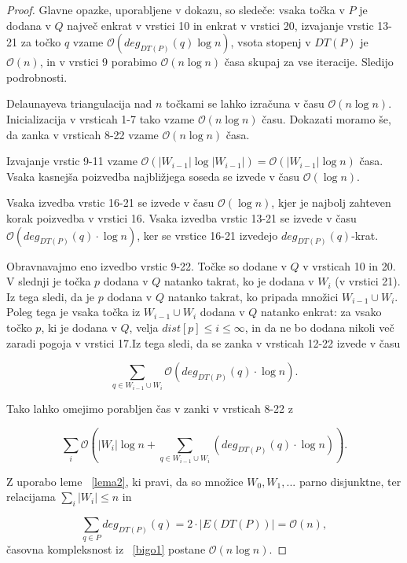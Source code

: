 \documentclass[a4paper, 12pt]{book}
\newcommand{\OO}{\ensuremath{\mathcal{O}}} %
\begin{document}
\begin{proof}
Glavne opazke, uporabljene v dokazu, so sledeče: vsaka točka v $P$ je dodana v $Q$ največ enkrat v vrstici 10 in enkrat v vrstici 20, izvajanje vrstic 13-21 za točko $q$ vzame $\OO(deg_{DT(P)}(q)\log n)$, vsota stopenj v $DT(P)$ je $\OO(n)$, in v vrstici 9 porabimo $\OO(n\log n)$ časa skupaj za vse iteracije. Sledijo podrobnosti.

Delaunayeva triangulacija nad $n$ točkami se lahko izračuna v času $\OO(n\log n)$. Inicializacija v vrsticah 1-7 tako vzame $\OO(n\log n)$ času. Dokazati moramo še, da zanka v vrsticah 8-22 vzame $\OO(n\log n)$ časa.

Izvajanje vrstic 9-11 vzame $\OO(|W_{i-1}|\log |W_{i-1}|) = \OO(|W_{i-1}|\log n)$ časa. Vsaka kasnejša poizvedba najbližjega soseda se izvede v času $\OO(\log n)$.

Vsaka izvedba vrstic 16-21 se izvede v času $\OO(\log n)$, kjer je najbolj zahteven korak poizvedba v vrstici 16. Vsaka izvedba vrstic 13-21 se izvede v času $\OO(deg_{DT(P)}(q)\cdot\log n)$, ker se vrstice 16-21 izvedejo $deg_{DT(P)}(q)$-krat.

Obravnavajmo eno izvedbo vrstic 9-22. Točke so dodane v $Q$ v vrsticah 10 in 20. V slednji je točka $p$ dodana v $Q$ natanko takrat, ko je dodana v $W_i$ (v vrstici 21). Iz tega sledi, da je $p$ dodana v $Q$ natanko takrat, ko pripada množici $W_{i-1}\cup W_i$. Poleg tega je vsaka točka iz $W_{i-1}\cup W_i$ dodana v $Q$ natanko enkrat: za vsako točko $p$, ki je dodana v $Q$, velja $dist[p]\leq i \le \infty$, in da ne bo dodana nikoli več zaradi pogoja v vrstici 17.Iz tega sledi, da se zanka v vrsticah 12-22 izvede v času

\begin{equation}
\sum_{q\in W_{i-1}\cup W_i} \OO(deg_{DT(P)}(q) \cdot \log n).
\end{equation}

Tako lahko omejimo porabljen čas v zanki v vrsticah 8-22 z

\begin{equation}
\label{bigo1}
\sum_i \OO \left( |W_i|\log n + \sum_{q\in W_{i-1}\cup W_i} (deg_{DT(P)}(q) \cdot \log n) \right) .
\end{equation}

Z uporabo leme ~\ref{lema2}, ki pravi, da so množice $W_0,W_1,...$ parno disjunktne, ter relacijama $\sum_i |W_i| \leq n$ in 

\begin{equation}
\sum_{q \in P} deg_{DT(P)}(q) = 2 \cdot |E(DT(P))| = \OO(n),
\end{equation}
časovna kompleksnost iz ~\ref{bigo1} postane $\OO(n\log n)$.
\end{proof}
\end{document}
